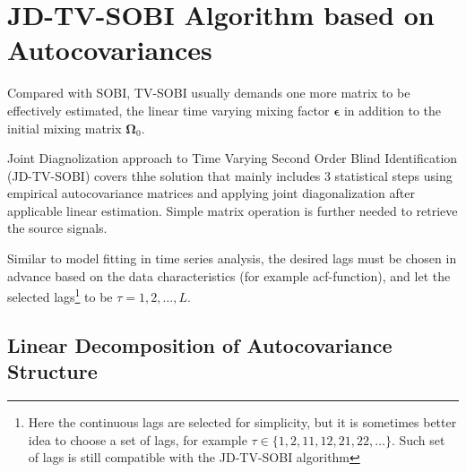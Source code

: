 \documentclass[utf8,english]{gradu3}
\begin{document}
\chapter{JD-TV-SOBI Algorithm based on Autocovariances}

Compared with SOBI, TV-SOBI usually demands one more matrix to be effectively estimated, the linear time varying mixing factor $\boldsymbol{\epsilon}$ in addition to the initial mixing matrix $\boldsymbol{\Omega}_0$.

Joint Diagnolization approach to Time Varying Second Order Blind Identification (JD-TV-SOBI) covers thhe solution that mainly includes 3 statistical steps using empirical autocovariance matrices and applying joint diagonalization after applicable linear estimation. Simple matrix operation is further needed to retrieve the source signals.

Similar to model fitting in time series analysis, the desired lags must be chosen in advance based on the data characteristics (for example acf-function), and let the selected lags\footnote{Here the continuous lags are selected for simplicity, but it is sometimes better idea to choose a set of lags, for example $\tau\in\{1,2,11,12,21,22,\dots\}$. Such set of lags is still compatible with the JD-TV-SOBI algorithm} to be $\tau=1,2,\dots,L$.

\section{Linear Decomposition of Autocovariance Structure}
\end{document}
